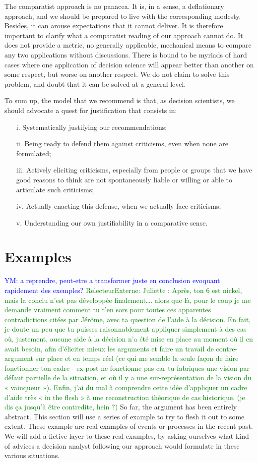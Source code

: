 \documentclass[preprint,11pt]{elsarticle}
\newcommand{\commentYM}[1]{\textcolor{blue}{YM: #1}}
\newcommand{\commentE}[1]{\textcolor{green}{RelecteurExterne: #1}}
\begin{document}
The comparatist approach is no panacea. It is, in a sense, a deflationary approach, and we should be prepared to live with the corresponding modesty. Besides, it can arouse expectations that it cannot deliver. It is therefore important to clarify what a comparatist reading of our approach cannot do. It does not provide a metric, no generally applicable, mechanical means to compare any two applications without discussions. There is bound to be myriads of hard cases where one application of decision science will appear better than another on some respect, but worse on another respect. We do not claim to solve this problem, and doubt that it can be solved at a general level.

To sum up, the model that we recommend is that, as decision scientists, we should advocate a quest for justification that consists in:
\begin{itemize}
\item[i.]	Systematically justifying our recommendations;
\item[ii.]	Being ready to defend them against criticisms, even when none are formulated;
\item[iii.]	Actively eliciting criticisms, especially from people or groups that we have good reasons to think are not spontaneously liable or willing or able to articulate such criticisms;
\item[iv.]	Actually enacting this defense, when we actually face criticisms;
\item[v.]	Understanding our own justifiability in a comparative sense.
\end{itemize}

\section{Examples}
\commentYM{a reprendre, peut-etre a transformer juste en conclusion evoquant rapidement des exemples?}
\commentE{Juliette : Après, ton 6 est nickel, mais la conclu n’est pas développée finalement…. alors que là, pour le coup je me demande vraiment comment tu t’en sors pour toutes ces apparentes contradictions citées par Jérôme, avec ta question de l’aide à la décision. 
En fait, je doute un peu que tu puisses raisonnablement appliquer simplement à des cas où, justement, aucune aide à la décision n’a été mise en place au moment où il en avait besoin, afin d’éliciter mieux les arguments et faire un travail de contre-argument sur place et en temps réel (ce qui me semble la seule façon de faire fonctionner ton cadre - ex-post ne fonctionne pas car tu fabriques une vision par défaut partielle de la situation, et où il y a une sur-représentation de la vision du « vainqueur »). Enfin, j’ai du mal à comprendre cette idée d’appliquer un cadre d’aide très « in the flesh » à une reconstruction théorique de cas historique. (je dis ça jusqu’à être contredite, hein ?)
}
So far, the argument has been entirely abstract. This section will use a series of example to try to flesh it out to some extent. These example are real examples of events or processes in the recent past. We will add a fictive layer to these real examples, by asking ourselves what kind of advices a decision analyst following our approach would formulate in these various situations.
\end{document}

